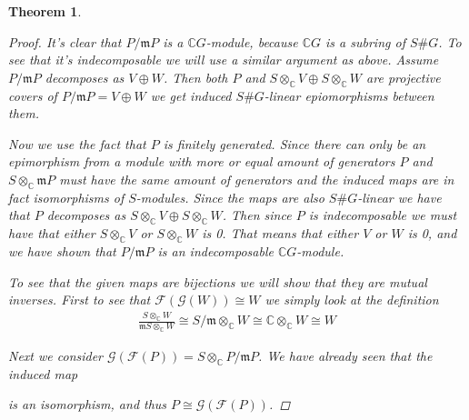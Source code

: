 \documentclass[11pt, a4paper, english]{article}
\numberwithin{prop}{section}
\numberwithin{lemma}{section}
\newtheorem{theorem}{Theorem}
\numberwithin{theorem}{section}
\numberwithin{defin}{section}
\numberwithin{example}{section}
\newcommand{\C}{\mathbb{C}}
\begin{document}
\begin{theorem}
\begin{proof}
It's clear that $P/\mathfrak{m}P$ is a $\C G$-module, because $\C G$ is a subring of $S\#G$. To see that it's indecomposable we will use a similar argument as above. Assume $P/\mathfrak{m}P$ decomposes as $V \oplus W$. Then both $P$ and $S\otimes_\C V \oplus S \otimes_\C W$ are projective covers of $P/\mathfrak{m}P = V\oplus W$ we get induced $S\#G$-linear epiomorphisms between them.

\begin{center}
\end{center}

Now we use the fact that $P$ is finitely generated. Since there can only be an epimorphism from a module with more or equal amount of generators $P$ and $S\otimes_\C \mathfrak{m}P$ must have the same amount of generators and the induced maps are in fact isomorphisms of $S$-modules. Since the maps are also $S\#G$-linear we have that $P$ decomposes as $S\otimes_\C V \oplus S \otimes_\C W$. Then since $P$ is indecomposable we must have that either $S \otimes_\C V$ or $S\otimes_\C W$ is 0. That means that either $V$ or $W$ is 0, and we have shown that $P/\mathfrak{m}P$ is an indecomposable $\C G$-module.

To see that the given maps are bijections we will show that they are mutual inverses. First to see that $\mathcal{F}(\mathcal{G}(W)) \cong W$ we simply look at the definition
\begin{equation*}
\begin{split}
\frac{S \otimes_\C W}{\mathfrak{m}S \otimes_\C W} \cong S/\mathfrak{m} \otimes_\C W \cong \C \otimes_\C W \cong W
\end{split}
\end{equation*}

Next we consider $\mathcal{G}(\mathcal{F}(P)) = S \otimes_\C P/\mathfrak{m}P$. We have already seen that the induced map
\begin{center}
\end{center}
is an isomorphism, and thus $P \cong \mathcal{G}(\mathcal{F}(P))$.
\end{proof}

\end{theorem}
\end{document}

